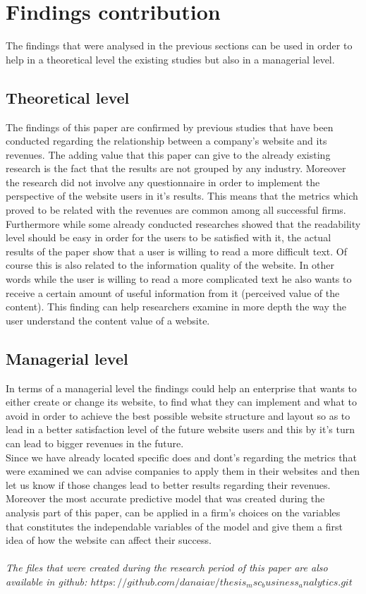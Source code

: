 \documentclass{book}
\begin{document}
\section{Findings contribution}
The findings that were analysed in the previous sections can be used in order to help in a theoretical level the existing studies but also in a managerial level.
\subsection{Theoretical level}
The findings of this paper are confirmed by previous studies that have been conducted regarding the relationship between a company's website and its revenues. The adding value that this paper can give to the already existing research is the fact that the results are not grouped by any industry. Moreover the research did not involve any questionnaire in order to implement the perspective of the website users in it's results. This means that the metrics which proved to be related with the revenues are common among all successful firms.\\
Furthermore while some already conducted researches showed that the readability level should be easy in order for the users to be satisfied with it, the actual results of the paper show that a user is willing to read a more difficult text. Of course this is also related to the information quality of the website. In other words while the user is willing to read a more complicated text he also wants to receive a certain amount of useful information from it (perceived value of the content). This finding can help researchers examine in more depth the way the user understand the content value of a website.
\subsection{Managerial level}
In terms of a managerial level the findings could help an enterprise that wants to either create or change its website, to find what they can implement and what to avoid in order to achieve the best possible website structure and layout so as to lead in a better satisfaction level of the future website users and this by it's turn can lead to bigger revenues in the future.\\
Since we have already located specific does and dont's regarding the metrics that were examined we can advise companies to apply them in their websites and then let us know if those changes lead to better results regarding their revenues.\\
Moreover the most accurate predictive model that was created during the analysis part of this paper, can be applied in a firm's choices on the variables that constitutes the independable variables of the model and give them a first idea of how the website can affect their success.\\\\
\textit{The files that were created during the research period of this paper are also available in github: $https://github.com/danaiav/thesis_msc_business_analytics.git$ }
\pagebreak
\end{document}
